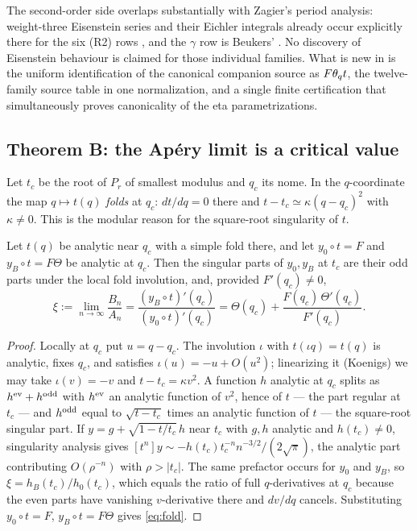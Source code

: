 \begin{remark}\label{rem:novelty}
The second-order side overlaps substantially with Zagier's period analysis:
weight-three Eisenstein series and their Eichler integrals already occur
explicitly there for the six (R2) rows \cite{Zagier2009}, and the $\gamma$ row
is Beukers' \cite{Beukers1987}.  No discovery of Eisenstein behaviour is
claimed for those individual families.  What is new in \cite{ProjEisenstein} is
the uniform identification of the canonical companion source as $F\theta_q t$, the
twelve-family source table in one normalization, and a single finite
certification that simultaneously proves canonicality of the eta
parametrizations.
\end{remark}

\subsection{Theorem B: the Ap\'ery limit is a critical value}\label{sec:thmB}

Let $t_c$ be the root of $P_r$ of smallest modulus and $q_c$ its nome.  In the
$q$-coordinate the map $q\mapsto t(q)$ \emph{folds} at $q_c$: $dt/dq=0$ there
and $t-t_c\simeq\kappa(q-q_c)^2$ with $\kappa\neq0$.  This is the modular
reason for the square-root singularity of $t$.

\begin{lemma}\label{lem:fold}
\Proved{} Let $t(q)$ be analytic near $q_c$ with a simple fold there, and let
$y_0\circ t=F$ and $y_B\circ t=F\Theta$ be analytic at $q_c$.  Then the
singular parts of $y_0,y_B$ at $t_c$ are their odd parts under the local fold
involution, and, provided $F'(q_c)\neq0$,
\begin{equation}\label{eq:fold}
\xi:=\lim_{n\to\infty}\frac{B_n}{A_n}
=\frac{(y_B\circ t)'(q_c)}{(y_0\circ t)'(q_c)}
=\Theta(q_c)+\frac{F(q_c)\,\Theta'(q_c)}{F'(q_c)} .
\end{equation}
\end{lemma}

\begin{proof}
Locally at $q_c$ put $u=q-q_c$.  The involution $\iota$ with
$t(\iota q)=t(q)$ is analytic, fixes $q_c$, and satisfies
$\iota(u)=-u+O(u^2)$; linearizing it (Koenigs) we may take $\iota(v)=-v$ and
$t-t_c=\kappa v^2$.  A function $h$ analytic at $q_c$ splits as
$h^{\rm ev}+h^{\rm odd}$ with $h^{\rm ev}$ an analytic function of $v^2$,
hence of $t$ --- the part regular at $t_c$ --- and $h^{\rm odd}$ equal to
$\sqrt{t-t_c}$ times an analytic function of $t$ --- the square-root singular
part.  If $y=g+\sqrt{1-t/t_c}\,h$ near $t_c$ with $g,h$ analytic and
$h(t_c)\neq0$, singularity analysis gives
$[t^n]y\sim-h(t_c)t_c^{-n}n^{-3/2}/(2\sqrt\pi)$, the analytic part
contributing $O(\rho^{-n})$ with $\rho>|t_c|$.  The same prefactor occurs for
$y_0$ and $y_B$, so $\xi=h_B(t_c)/h_0(t_c)$, which equals the ratio of full
$q$-derivatives at $q_c$ because the even parts have vanishing $v$-derivative
there and $dv/dq$ cancels.  Substituting $y_0\circ t=F$, $y_B\circ t=F\Theta$
gives \eqref{eq:fold}.
\end{proof}

